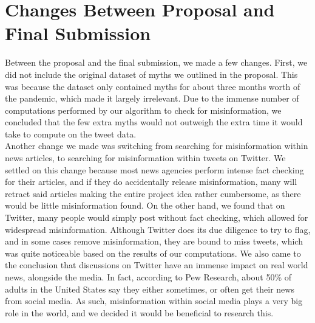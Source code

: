 \documentclass[fontsize=11pt]{article}
\begin{document}
    \section*{Changes Between Proposal and Final Submission}
    Between the proposal and the final submission, we made a few changes. First, we did not include the original dataset of myths we outlined in the proposal. This was because the dataset only contained myths for about three months worth of the pandemic, which made it largely irrelevant. Due to the immense number of computations performed by our algorithm to check for misinformation, we concluded that the few extra myths would not outweigh the extra time it would take to compute on the tweet data. \\
    Another change we made was switching from searching for misinformation within news articles, to searching for misinformation within tweets on Twitter. We settled on this change because most news agencies perform intense fact checking for their articles, and if they do accidentally release misinformation, many will retract said articles making the entire project idea rather cumbersome, as there would be little misinformation found. On the other hand, we found that on Twitter, many people would simply post without fact checking, which allowed for widespread misinformation. Although Twitter does its due diligence to try to flag, and in some cases remove misinformation, they are bound to miss tweets, which was quite noticeable based on the results of our computations. We also came to the conclusion that discussions on Twitter have an immense impact on real world news, alongside the media. In fact, according to Pew Research, about 50\% of adults in the United States say they either sometimes, or often get their news from social media. As such, misinformation within social media plays a very big role in the world, and we decided it would be beneficial to research this.

    \newpage
\end{document}
